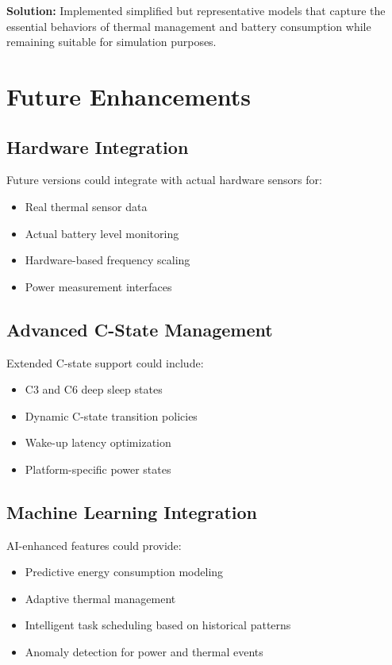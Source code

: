 \documentclass[11pt,a4paper]{article}
\begin{document}
\textbf{Solution:} Implemented simplified but representative models that capture the essential behaviors of thermal management and battery consumption while remaining suitable for simulation purposes.

\section{Future Enhancements}

\subsection{Hardware Integration}
Future versions could integrate with actual hardware sensors for:
\begin{itemize}
    \item Real thermal sensor data
    \item Actual battery level monitoring
    \item Hardware-based frequency scaling
    \item Power measurement interfaces
\end{itemize}

\subsection{Advanced C-State Management}
Extended C-state support could include:
\begin{itemize}
    \item C3 and C6 deep sleep states
    \item Dynamic C-state transition policies
    \item Wake-up latency optimization
    \item Platform-specific power states
\end{itemize}

\subsection{Machine Learning Integration}
AI-enhanced features could provide:
\begin{itemize}
    \item Predictive energy consumption modeling
    \item Adaptive thermal management
    \item Intelligent task scheduling based on historical patterns
    \item Anomaly detection for power and thermal events
\end{itemize}
\end{document}

